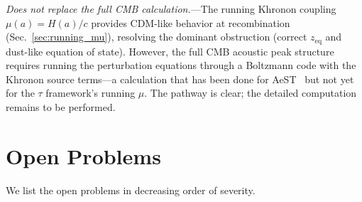 \documentclass[prd,twocolumn,superscriptaddress,longbibliography,floatfix]{revtex4-2}
\newcommand{\tauasym}{\tau}
\begin{document}
\emph{Does not replace the full CMB calculation.}---The
running Khronon coupling $\mu(a) = H(a)/c$ provides
CDM-like behavior at recombination
(Sec.~\ref{sec:running_mu}), resolving the dominant
obstruction (correct $z_{\mathrm{eq}}$ and dust-like
equation of state).  However, the full CMB acoustic
peak structure requires running the perturbation
equations through a Boltzmann code with the Khronon
source terms---a calculation that has been done for
AeST~\cite{SkordisZlosnik2021} but not yet for the
$\tauasym$ framework's running $\mu$.  The pathway is
clear; the detailed computation remains to be performed.


\section{Open Problems}
\label{sec:open}

We list the open problems in decreasing order of
severity.
\end{document}
